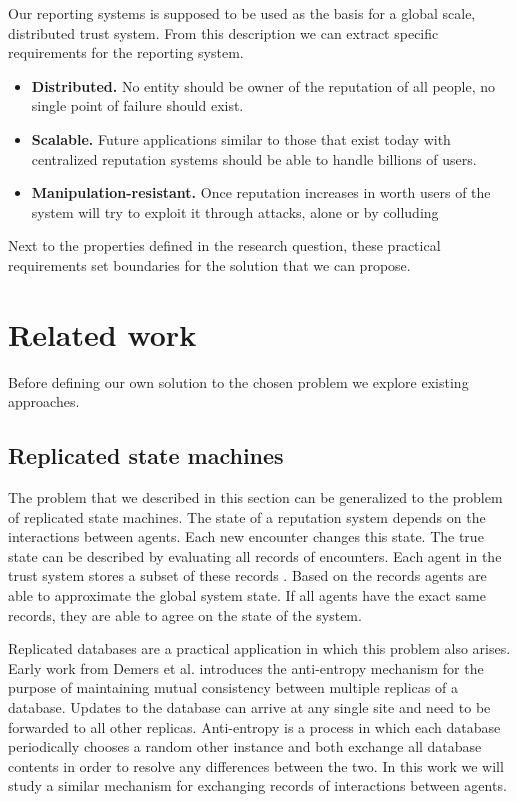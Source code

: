 Our reporting systems is supposed to be used as the basis for a global scale, distributed trust system. 
From this description we can extract specific requirements for the reporting system.


\begin{itemize}
    \item \textbf{Distributed.} No entity should be owner of the reputation of all people, no single point of
    failure should exist.
    \item \textbf{Scalable.} Future applications similar to those that exist today with centralized reputation
    systems should be able to handle billions of users.
    \item \textbf{Manipulation-resistant.} Once reputation increases in worth users of the 
    system will try to exploit it through attacks, alone or by colluding
\end{itemize}

Next to the properties defined in the research question, these practical requirements set boundaries
for the solution that we can propose.

\section{Related work}
\label{sec:related_work}
Before defining our own solution to the chosen problem we explore existing approaches.

\subsection{Replicated state machines}
The problem that we described in this section can be generalized to the problem of replicated 
state machines. The state of a reputation system depends on the interactions between agents. Each 
new encounter changes this state. The true state can be described by evaluating all records of 
encounters. Each agent in the trust system stores a subset of these records . Based on the records
agents are able to approximate the global system state. If all agents have the exact same records, 
they are able to agree on the state of the system. 

Replicated databases are a practical application in which this problem also arises. Early work from
Demers et al.\cite{demers1987epidemic} introduces the anti-entropy mechanism
for the purpose of maintaining mutual consistency between multiple replicas of a database. Updates
to the database can arrive at any single site and need to be forwarded to all other replicas. 
Anti-entropy is a process in which each database periodically 
chooses a random other instance and both exchange all database contents in order to resolve any 
differences between the two. In this work we will study a similar mechanism for exchanging records
of interactions between agents. 

